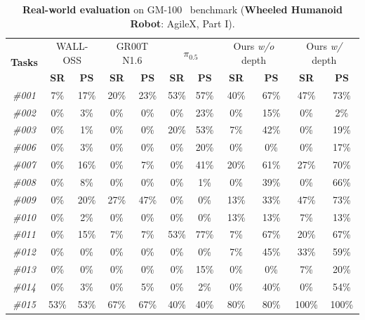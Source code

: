 \begin{table}[t]
  \centering
  \caption{\textbf{Real-world evaluation} on GM-100~\cite{gm100} benchmark (\textbf{Wheeled Humanoid Robot}: AgileX, Part I).}
  \small
  \setlength{\tabcolsep}{12pt}
    \begin{tabular}{ccccccccccc}
    \toprule
    \multirow{2}[2]{*}{\textbf{Tasks}} & \multicolumn{2}{c}{WALL-OSS} & \multicolumn{2}{c}{GR00T N1.6} & \multicolumn{2}{c}{$\pi_{0.5}$} & \multicolumn{2}{c}{Ours \textit{w/o} depth} & \multicolumn{2}{c}{Ours \textit{w/} depth} \\
          & \textbf{SR} & \textbf{PS} & \textbf{SR} & \textbf{PS} & \textbf{SR} & \textbf{PS} & \textbf{SR} & \textbf{PS} & \textbf{SR} & \textbf{PS} \\
    \midrule
    \textit{\#001} & 7\%   & 17\%  & 20\%  & 23\%  & 53\%  & 57\%  & 40\%  & 67\%  & 47\%  & 73\% \\
    \textit{\#002} & 0\%   & 3\%   & 0\%   & 0\%   & 0\%   & 23\%  & 0\%   & 15\%  & 0\%   & 2\% \\
    \textit{\#003} & 0\%   & 1\%   & 0\%   & 0\%   & 20\%  & 53\%  & 7\%   & 42\%  & 0\%   & 19\% \\
    \textit{\#006} & 0\%   & 3\%   & 0\%   & 0\%   & 0\%   & 20\%  & 0\%   & 0\%   & 0\%   & 17\% \\
    \textit{\#007} & 0\%   & 16\%  & 0\%   & 7\%   & 0\%   & 41\%  & 20\%  & 61\%  & 27\%  & 70\% \\
    \textit{\#008} & 0\%   & 8\%   & 0\%   & 0\%   & 0\%   & 1\%   & 0\%   & 39\%  & 0\%   & 66\% \\
    \textit{\#009} & 0\%   & 20\%  & 27\%  & 47\%  & 0\%   & 0\%   & 13\%  & 33\%  & 47\%  & 73\% \\
    \textit{\#010} & 0\%   & 2\%   & 0\%   & 0\%   & 0\%   & 0\%   & 13\%  & 13\%  & 7\%   & 13\% \\
    \textit{\#011} & 0\%   & 15\%  & 7\%   & 7\%   & 53\%  & 77\%  & 7\%   & 67\%  & 20\%  & 67\% \\
    \textit{\#012} & 0\%   & 0\%   & 0\%   & 0\%   & 0\%   & 0\%   & 7\%   & 45\%  & 33\%  & 59\% \\
    \textit{\#013} & 0\%   & 0\%   & 0\%   & 0\%   & 0\%   & 15\%  & 0\%   & 0\%   & 7\%   & 20\% \\
    \textit{\#014} & 0\%   & 3\%   & 0\%   & 5\%   & 0\%   & 2\%   & 0\%   & 40\%  & 0\%   & 54\% \\
    \textit{\#015} & 53\%  & 53\%  & 67\%  & 67\%  & 40\%  & 40\%  & 80\%  & 80\%  & 100\% & 100\% \\

\end{tabular}
\end{table}
